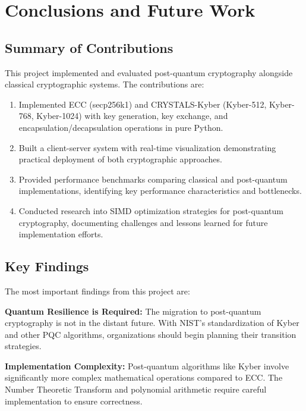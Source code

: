 \chapter{Conclusions and Future Work}

\section{Summary of Contributions}

This project implemented and evaluated post-quantum cryptography alongside classical cryptographic systems. The contributions are:

\begin{enumerate}
\item Implemented ECC (secp256k1) and CRYSTALS-Kyber (Kyber-512, Kyber-768, Kyber-1024) with key generation, key exchange, and encapsulation/decapsulation operations in pure Python.

\item Built a client-server system with real-time visualization demonstrating practical deployment of both cryptographic approaches.

\item Provided performance benchmarks comparing classical and post-quantum implementations, identifying key performance characteristics and bottlenecks.

\item Conducted research into SIMD optimization strategies for post-quantum cryptography, documenting challenges and lessons learned for future implementation efforts.
\end{enumerate}

\section{Key Findings}

The most important findings from this project are:

\textbf{Quantum Resilience is Required:} The migration to post-quantum cryptography is not in the distant future. With NIST's standardization of Kyber and other PQC algorithms, organizations should begin planning their transition strategies.

\textbf{Implementation Complexity:} Post-quantum algorithms like Kyber involve significantly more complex mathematical operations compared to ECC. The Number Theoretic Transform and polynomial arithmetic require careful implementation to ensure correctness.

